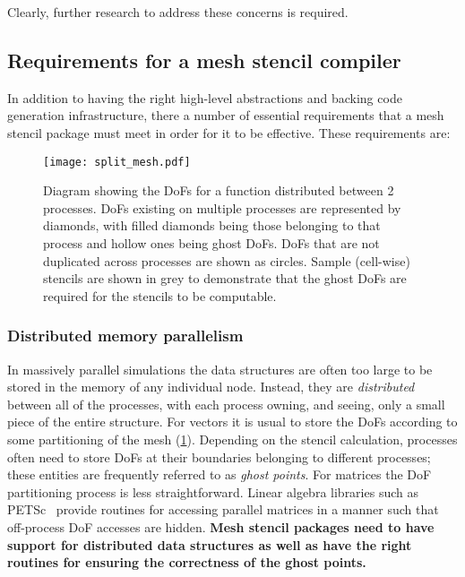 \documentclass[thesis]{subfiles}
\begin{document}
Clearly, further research to address these concerns is required.

\subsection{Requirements for a mesh stencil compiler}

In addition to having the right high-level abstractions and backing code generation infrastructure, there a number of essential requirements that a mesh stencil package must meet in order for it to be effective.
These requirements are:

\begin{figure}
  \centering
  \texttt{[image: split\_mesh.pdf]}
  \caption{
    Diagram showing the DoFs for a function distributed between 2 processes.
    DoFs existing on multiple processes are represented by diamonds, with filled diamonds being those belonging to that process and hollow ones being ghost DoFs.
    DoFs that are not duplicated across processes are shown as circles.
    Sample (cell-wise) stencils are shown in grey to demonstrate that the ghost DoFs are required for the stencils to be computable.
  }
  \label{fig:pyop2_split_mesh}
\end{figure}

\subsubsection{Distributed memory parallelism}

In massively parallel simulations the data structures are often too large to be stored in the memory of any individual node.
Instead, they are \textit{distributed} between all of the processes, with each process owning, and seeing, only a small piece of the entire structure.
For vectors it is usual to store the DoFs according to some partitioning of the mesh (\cref{fig:pyop2_split_mesh}).
Depending on the stencil calculation, processes often need to store DoFs at their boundaries belonging to different processes; these entities are frequently referred to as \textit{ghost points}.
For matrices the DoF partitioning process is less straightforward.
Linear algebra libraries such as PETSc~\cite{petsc-user-ref,petsc-web-page,petsc-efficient} provide routines for accessing parallel matrices in a manner such that off-process DoF accesses are hidden.
\textbf{Mesh stencil packages need to have support for distributed data structures as well as have the right routines for ensuring the correctness of the ghost points.}
\end{document}
